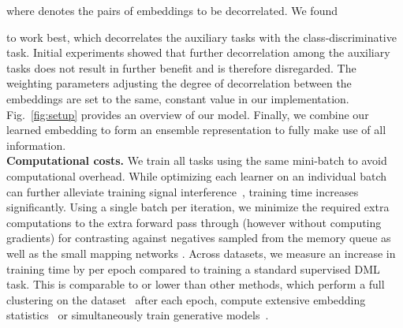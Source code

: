 \documentclass[runningheads]{llncs}
\begin{document}
\noindent
where  denotes the pairs of embeddings to be decorrelated. We found 

to work best, which decorrelates the auxiliary tasks with the class-discriminative task. Initial experiments showed that further decorrelation  among the auxiliary tasks does not result in further benefit and is therefore disregarded. The weighting parameters  adjusting the degree of decorrelation between the embeddings are set to the same, constant value in our implementation. Fig.~\ref{fig:setup} provides an overview of our model. Finally, we combine our learned embedding to form an ensemble representation to fully make use of all information.
\\
\noindent
\textbf{Computational costs.}
We train all tasks using the same mini-batch to avoid computational overhead. While optimizing each learner on an individual batch can further alleviate training signal interference~\cite{Sanakoyeu_2019_CVPR,dreml}, training time increases significantly. Using a single batch per iteration, we minimize the required extra computations to the extra forward pass through  (however without computing gradients) for contrasting against negatives sampled from the memory queue as well as the small mapping networks . Across datasets, we measure an increase in training time by  per epoch compared to training a standard supervised DML task. This is comparable to or lower than other methods, which perform a full clustering on the dataset~\cite{mic,Sanakoyeu_2019_CVPR} after each epoch, compute extensive embedding statistics~\cite{horde} or simultaneously train generative models~\cite{dvml}.
\end{document}
